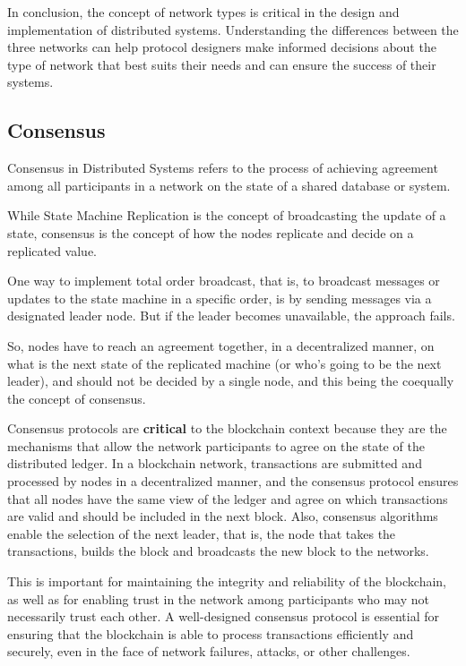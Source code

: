 In conclusion, the concept of network types is critical in the design and implementation of distributed systems. Understanding the differences between the three networks can help protocol designers make informed decisions about the type of network that best suits their needs and can ensure the success of their systems.

\subsection*{\textbf{Consensus}}
Consensus in Distributed Systems refers to the process of achieving agreement among all participants in a network on the state of a shared database or system.

While State Machine Replication is the concept of broadcasting the update of a state, consensus is the concept of how the nodes replicate and decide on a replicated value.

One way to implement total order broadcast, that is, to broadcast messages or updates to the state machine in a specific order, is by sending messages via a designated leader node. But if the leader becomes unavailable, the approach fails. 

So, nodes have to reach an agreement together, in a decentralized manner, on what is the next state of the replicated machine (or who's going to be the next leader), and should not be decided by a single node, and this being the coequally the concept of consensus.

Consensus protocols are \textbf{critical} to the blockchain context because they are the mechanisms that allow the network participants to agree on the state of the distributed ledger. In a blockchain network, transactions are submitted and processed by nodes in a decentralized manner, and the consensus protocol ensures that all nodes have the same view of the ledger and agree on which transactions are valid and should be included in the next block. Also, consensus algorithms enable the selection of the next leader, that is, the node that takes the transactions, builds the block and broadcasts the new block to the networks. 

This is important for maintaining the integrity and reliability of the blockchain, as well as for enabling trust in the network among participants who may not necessarily trust each other. A well-designed consensus protocol is essential for ensuring that the blockchain is able to process transactions efficiently and securely, even in the face of network failures, attacks, or other challenges.




